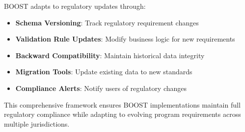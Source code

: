 BOOST adapts to regulatory updates through:

\begin{itemize}
    \item \textbf{Schema Versioning}: Track regulatory requirement changes
    \item \textbf{Validation Rule Updates}: Modify business logic for new requirements
    \item \textbf{Backward Compatibility}: Maintain historical data integrity
    \item \textbf{Migration Tools}: Update existing data to new standards
    \item \textbf{Compliance Alerts}: Notify users of regulatory changes
\end{itemize}

This comprehensive framework ensures BOOST implementations maintain full regulatory compliance while adapting to evolving program requirements across multiple jurisdictions.